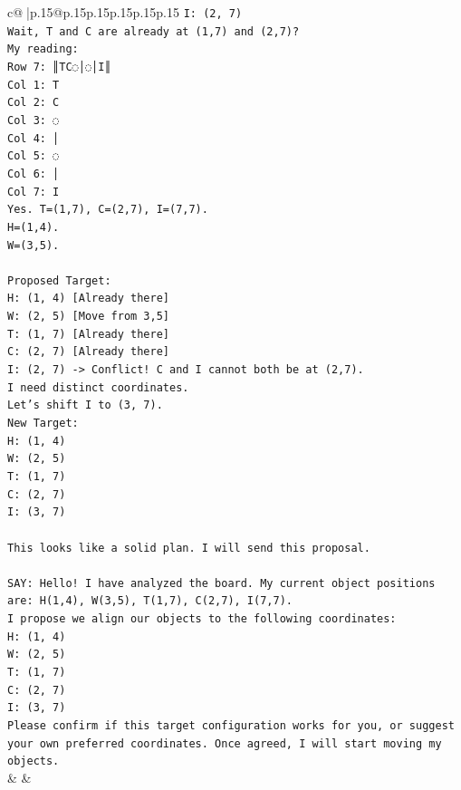 \documentclass{article}
\begin{document}
{\begin{supertabular}{c@{$\;$}|p{.15\linewidth}@{}p{.15\linewidth}p{.15\linewidth}p{.15\linewidth}p{.15\linewidth}p{.15\linewidth}}
{{{\texttt{I: (2, 7)} \\
\texttt{Wait, T and C are already at (1,7) and (2,7)?} \\
\texttt{My reading:} \\
\texttt{Row 7: ║TC◌│◌│I║} \\
\texttt{Col 1: T} \\
\texttt{Col 2: C} \\
\texttt{Col 3: ◌} \\
\texttt{Col 4: │} \\
\texttt{Col 5: ◌} \\
\texttt{Col 6: │} \\
\texttt{Col 7: I} \\
\texttt{Yes. T=(1,7), C=(2,7), I=(7,7).} \\
\texttt{H=(1,4).} \\
\texttt{W=(3,5).} \\
\\ 
\texttt{Proposed Target:} \\
\texttt{H: (1, 4) {[}Already there{]}} \\
\texttt{W: (2, 5) {[}Move from 3,5{]}} \\
\texttt{T: (1, 7) {[}Already there{]}} \\
\texttt{C: (2, 7) {[}Already there{]}} \\
\texttt{I: (2, 7) {-}> Conflict! C and I cannot both be at (2,7).} \\
\texttt{I need distinct coordinates.} \\
\texttt{Let's shift I to (3, 7).} \\
\texttt{New Target:} \\
\texttt{H: (1, 4)} \\
\texttt{W: (2, 5)} \\
\texttt{T: (1, 7)} \\
\texttt{C: (2, 7)} \\
\texttt{I: (3, 7)} \\
\\ 
\texttt{This looks like a solid plan. I will send this proposal.} \\
\\ 
\texttt{SAY: Hello! I have analyzed the board. My current object positions are: H(1,4), W(3,5), T(1,7), C(2,7), I(7,7).} \\
\texttt{I propose we align our objects to the following coordinates:} \\
\texttt{H: (1, 4)} \\
\texttt{W: (2, 5)} \\
\texttt{T: (1, 7)} \\
\texttt{C: (2, 7)} \\
\texttt{I: (3, 7)} \\
\texttt{Please confirm if this target configuration works for you, or suggest your own preferred coordinates. Once agreed, I will start moving my objects.} \\
            }
        }
    }
    & & \\ \\


\end{supertabular}}
\end{document}
